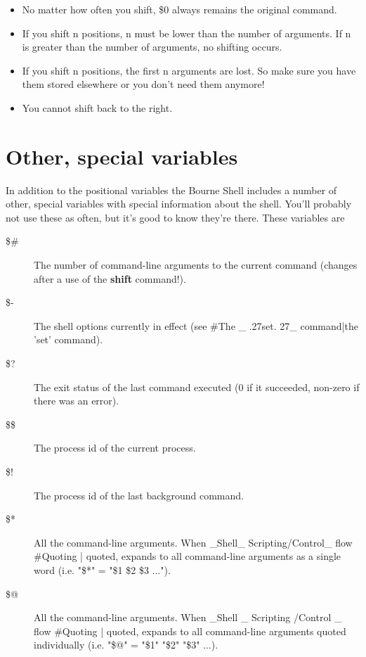\begin{itemize}
\item No matter how often you shift, \$0 always remains the original command.
\item If you shift n positions, n must be lower than the number of arguments.
If n is greater than the number of arguments, no shifting occurs.
\item If you shift n positions, the first n arguments are lost. So make sure
you have them stored elsewhere or you don't need them anymore!
\item You cannot shift back to the right.
\end{itemize}

\section{Other, special variables}
In addition to the positional variables the Bourne Shell includes a number of
other, special variables with special information about the shell. You'll
probably not use these as often, but it's good to know they're there. These
variables are
\begin{description}
	\item[\$\#]The number of command-line arguments to the current command (changes after a use of the \textbf{shift} command!).
	\item[\$-]The shell options currently in effect (see \#The \_ .27set. 27\_ command|the 'set' command).
	\item[\$?]The exit status of the last command executed (0 if it succeeded, non-zero if there was an error).
	\item[\$\$]The process id of the current process.
	\item[\$!]The process id of the last background command.
	\item[\$*]All the command-line arguments. When \_Shell\_ Scripting/Control\_ flow \#Quoting | quoted, expands to all command-line arguments as a single word (i.e. "\$*" = "\$1 \$2 \$3 ...").
	\item[\$@]All the command-line arguments. When \_Shell \_ Scripting /Control \_ flow \#Quoting | quoted, expands to all command-line arguments quoted individually (i.e. "\$@" = "\$1" "\$2" "\$3" ...).
\end{description}

